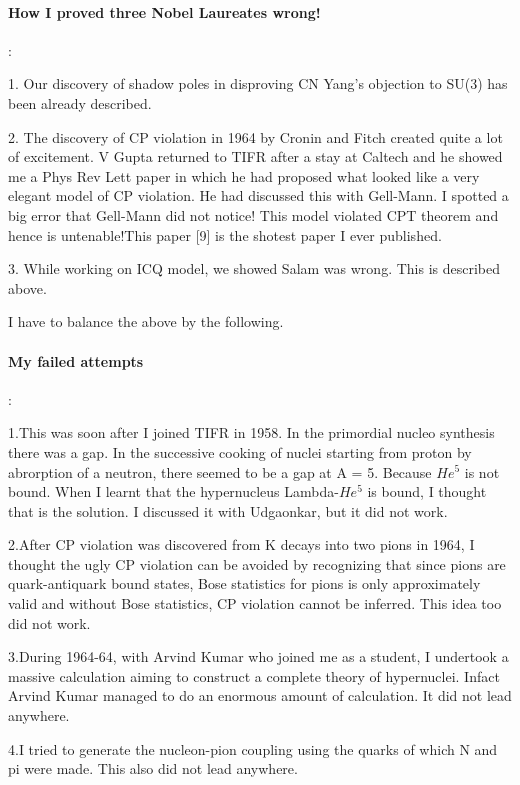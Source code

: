 \paragraph{How I proved three Nobel Laureates wrong!}:

1. Our discovery of shadow poles in disproving CN Yang's objection to 
SU(3) has been already described.

2. The discovery of CP violation in 1964 by Cronin and Fitch created 
quite a lot of excitement. V Gupta returned to TIFR after a stay at 
Caltech and he showed me a Phys Rev Lett paper in which he had proposed 
what looked like a very elegant model of CP violation. He had discussed 
this with Gell-Mann. I spotted a big error that Gell-Mann did not 
notice! This model violated CPT theorem and hence is untenable!This 
paper [9] is the shotest paper I ever published.

3. While working on ICQ model, we showed Salam was wrong. This is 
described above.

I have to balance the above by the following.

\paragraph{My failed attempts}:

1.This was soon after I joined TIFR in 1958. In the primordial nucleo 
synthesis there was a gap. In the successive cooking of nuclei starting 
from proton by abrorption of a neutron, there seemed to be a gap at A = 
5. Because $He^5$ is not bound. When I learnt that the hypernucleus 
Lambda-$He^5$ is bound, I thought that is the solution. I discussed it 
with Udgaonkar, but it did not work.

2.After CP violation was discovered from K decays into two pions in 
1964, I thought the ugly CP violation can be avoided by recognizing that 
since pions are quark-antiquark bound states, Bose statistics for pions 
is only approximately valid and without Bose statistics, CP violation 
cannot be inferred. This idea too did not work.

3.During 1964-64, with Arvind Kumar who joined me as a student, I 
undertook a massive calculation aiming to construct a complete theory of 
hypernuclei. Infact Arvind Kumar managed to do an enormous amount of 
calculation. It did not lead anywhere.

4.I tried to generate the nucleon-pion coupling using the quarks of 
which N and pi were made. This also did not lead anywhere.

